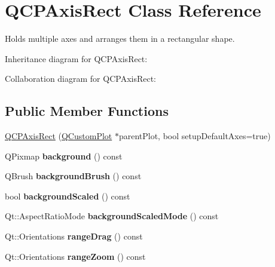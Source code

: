\hypertarget{classQCPAxisRect}{}\section{Q\+C\+P\+Axis\+Rect Class Reference}
\label{classQCPAxisRect}


Holds multiple axes and arranges them in a rectangular shape.  




Inheritance diagram for Q\+C\+P\+Axis\+Rect\+:


Collaboration diagram for Q\+C\+P\+Axis\+Rect\+:
\subsection*{Public Member Functions}
\begin{DoxyCompactItemize}
\item 
\hyperlink{classQCPAxisRect_a60b31dece805462c1b82eea2e69ba042}{Q\+C\+P\+Axis\+Rect} (\hyperlink{classQCustomPlot}{Q\+Custom\+Plot} $\ast$parent\+Plot, bool setup\+Default\+Axes=true)
\item 
Q\+Pixmap {\bfseries background} () const \hypertarget{classQCPAxisRect_a0daa1dadd2a62dbfa37b7f742edd0059}{}\label{classQCPAxisRect_a0daa1dadd2a62dbfa37b7f742edd0059}

\item 
Q\+Brush {\bfseries background\+Brush} () const \hypertarget{classQCPAxisRect_a6f8f9f9ff63a803a3cf8796e77a98123}{}\label{classQCPAxisRect_a6f8f9f9ff63a803a3cf8796e77a98123}

\item 
bool {\bfseries background\+Scaled} () const \hypertarget{classQCPAxisRect_a67c18777b88fe9c81dee3dd2b5f50e5c}{}\label{classQCPAxisRect_a67c18777b88fe9c81dee3dd2b5f50e5c}

\item 
Qt\+::\+Aspect\+Ratio\+Mode {\bfseries background\+Scaled\+Mode} () const \hypertarget{classQCPAxisRect_a3d0f42d6be11a0b3d4576402a2b0032d}{}\label{classQCPAxisRect_a3d0f42d6be11a0b3d4576402a2b0032d}

\item 
Qt\+::\+Orientations {\bfseries range\+Drag} () const \hypertarget{classQCPAxisRect_af24b46954ce27a26b23770cdb8319080}{}\label{classQCPAxisRect_af24b46954ce27a26b23770cdb8319080}

\item 
Qt\+::\+Orientations {\bfseries range\+Zoom} () const \hypertarget{classQCPAxisRect_a3397fc60e5df29089090bc236e9f05f6}{}\label{classQCPAxisRect_a3397fc60e5df29089090bc236e9f05f6}


\end{DoxyCompactItemize}
